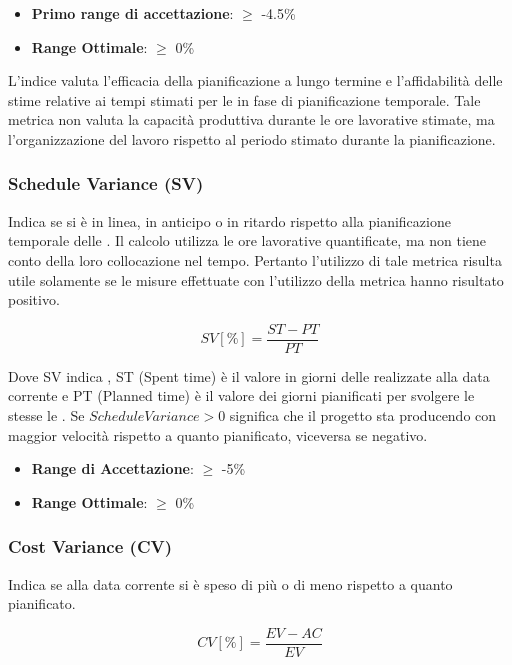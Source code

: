 \documentclass[12pt,a4paper]{article}
\begin{document}
\begin{itemize}
	\item \textbf{Primo range di accettazione}: $\geq$ -4.5\%
	\item \textbf{Range Ottimale}: $\geq$ 0\%
\end{itemize}

L'indice  valuta l'efficacia della pianificazione a lungo termine e l'affidabilità delle stime relative ai tempi stimati per le   in fase di pianificazione temporale. Tale metrica non valuta la capacità produttiva durante le ore lavorative stimate, ma l'organizzazione del lavoro rispetto al periodo stimato durante la pianificazione.

\subsubsection{Schedule Variance (SV)} \label{schedule_variance}
Indica se si è in linea, in anticipo o in ritardo rispetto alla pianificazione temporale delle . Il calcolo utilizza le ore lavorative quantificate, ma non tiene conto della loro collocazione nel tempo. Pertanto l'utilizzo di tale metrica risulta utile solamente se le misure effettuate con l'utilizzo della metrica  hanno risultato positivo.

\[SV [\%] = \frac{ST - PT}{PT}\]

Dove SV indica  , ST (Spent time) è il valore in giorni delle   realizzate alla data corrente e PT (Planned time) è il valore dei giorni pianificati per svolgere le stesse le . Se $ScheduleVariance > 0$ significa che il progetto sta producendo con maggior velocità rispetto a quanto pianificato, viceversa se negativo.

\begin{itemize}
\item \textbf{Range di Accettazione}: $\geq$ -5\%
\item \textbf{Range Ottimale}: $\geq$ 0\%
\end{itemize}

\subsubsection{Cost Variance (CV)}
Indica se alla data corrente si è speso di più o di meno rispetto a quanto pianificato.

\[CV [\%] = \frac{EV - AC}{EV}\]
\end{document}
